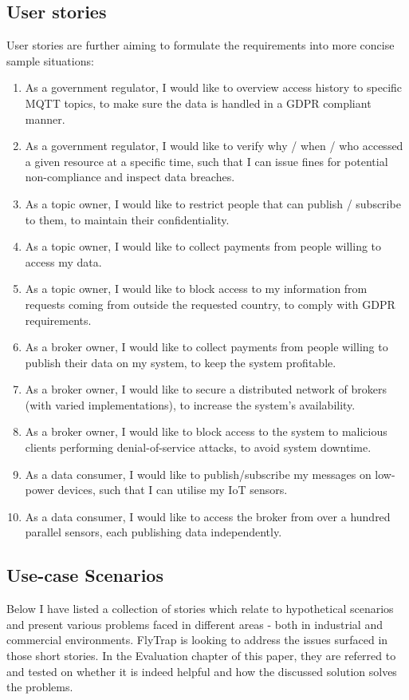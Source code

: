 \subsection{User stories}
User stories are further aiming to formulate the requirements into more concise sample situations:
\begin{enumerate}
\item As a government regulator, I would like to overview access history to specific MQTT topics, to make sure the data is handled in a GDPR compliant manner.
\item As a government regulator, I would like to verify why / when / who accessed a given resource at a specific time, such that I can issue fines for potential non-compliance and inspect data breaches.
\item As a topic owner, I would like to restrict people that can publish / subscribe to them, to maintain their confidentiality.
\item As a topic owner, I would like to collect payments from people willing to access my data.
\item As a topic owner, I would like to block access to my information from requests coming from outside the requested country, to comply with GDPR requirements.
\item As a broker owner, I would like to collect payments from people willing to publish their data on my system, to keep the system profitable.
\item As a broker owner, I would like to secure a distributed network of brokers (with varied implementations), to increase the system's availability. 
\item As a broker owner, I would like to block access to the system to malicious clients performing denial-of-service attacks, to avoid system downtime.
\item As a data consumer, I would like to publish/subscribe my messages on low-power devices, such that I can utilise my IoT sensors.
\item As a data consumer, I would like to access the broker from over a hundred parallel sensors, each publishing data independently.
\end{enumerate}

\subsection{Use-case Scenarios}\label{sec:usecase}
Below I have listed a collection of stories which relate to hypothetical scenarios and present various problems faced in different areas - both in industrial and commercial environments. FlyTrap is looking to address the issues surfaced in those short stories. In the Evaluation chapter of this paper, they are referred to and tested on whether it is indeed helpful and how the discussed solution solves the problems.
\\
